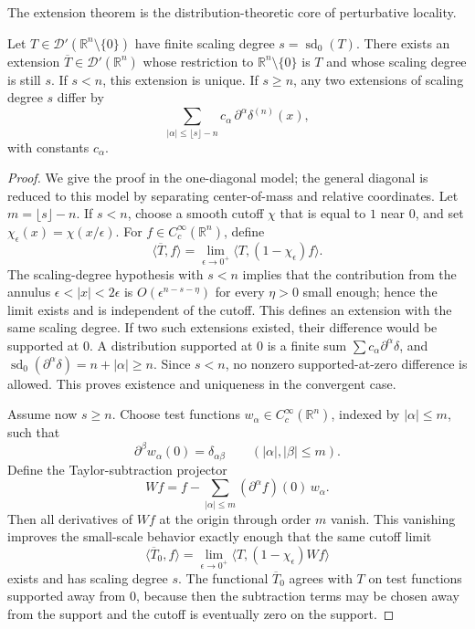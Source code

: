 The extension theorem is the distribution-theoretic core of perturbative
locality.

\begin{theorem}
\label{thm:extension-at-a-diagonal}
Let \(T\in\mathcal D'(\mathbb R^n\setminus\{0\})\) have finite scaling degree
\(s=\operatorname{sd}_0(T)\).  There exists an extension
\(\overline T\in\mathcal D'(\mathbb R^n)\) whose restriction to
\(\mathbb R^n\setminus\{0\}\) is \(T\) and whose scaling degree is still
\(s\).  If \(s<n\), this extension is unique.  If \(s\ge n\), any two
extensions of scaling degree \(s\) differ by
\[
  \sum_{|\alpha|\le \lfloor s\rfloor-n}
  c_\alpha\,\partial^\alpha\delta^{(n)}(x),
\]
with constants \(c_\alpha\).
\end{theorem}

\begin{proof}
We give the proof in the one-diagonal model; the general diagonal is reduced
to this model by separating center-of-mass and relative coordinates.  Let
\(m=\lfloor s\rfloor-n\).  If \(s<n\), choose a smooth cutoff \(\chi\) that is
equal to \(1\) near \(0\), and set \(\chi_\epsilon(x)=\chi(x/\epsilon)\).
For \(f\in C_c^\infty(\mathbb R^n)\), define
\[
  \langle \overline T,f\rangle
  =
  \lim_{\epsilon\to0^+}
  \langle T,(1-\chi_\epsilon)f\rangle .
\]
The scaling-degree hypothesis with \(s<n\) implies that the contribution from
the annulus \(\epsilon<|x|<2\epsilon\) is \(O(\epsilon^{n-s-\eta})\) for every
\(\eta>0\) small enough; hence the limit exists and is independent of the
cutoff.  This defines an extension with the same scaling degree.  If two such
extensions existed, their difference would be supported at \(0\).  A
distribution supported at \(0\) is a finite sum
\(\sum c_\alpha\partial^\alpha\delta\), and
\(\operatorname{sd}_0(\partial^\alpha\delta)=n+|\alpha|\ge n\).  Since
\(s<n\), no nonzero supported-at-zero difference is allowed.  This proves
existence and uniqueness in the convergent case.

Assume now \(s\ge n\).  Choose test functions \(w_\alpha\in
C_c^\infty(\mathbb R^n)\), indexed by \(|\alpha|\le m\), such that
\[
  \partial^\beta w_\alpha(0)=\delta_{\alpha\beta}
  \qquad (|\alpha|,|\beta|\le m).
\]
Define the Taylor-subtraction projector
\[
  Wf
  =
  f-\sum_{|\alpha|\le m}(\partial^\alpha f)(0)\,w_\alpha .
\]
Then all derivatives of \(Wf\) at the origin through order \(m\) vanish.  This
vanishing improves the small-scale behavior exactly enough that the same
cutoff limit
\[
  \langle \overline T_0,f\rangle
  =
  \lim_{\epsilon\to0^+}
  \langle T,(1-\chi_\epsilon)Wf\rangle
\]
exists and has scaling degree \(s\).  The functional \(\overline T_0\) agrees
with \(T\) on test functions supported away from \(0\), because then the
subtraction terms may be chosen away from the support and the cutoff is
eventually zero on the support.


\end{proof}
